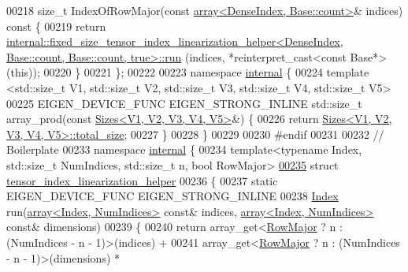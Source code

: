 \begin{DoxyCode}
00218   \textcolor{keywordtype}{size\_t} IndexOfRowMajor(\textcolor{keyword}{const} \hyperlink{class_eigen_1_1array}{array<DenseIndex, Base::count>}& indices)\textcolor{keyword}{ const
       }\{
00219     \textcolor{keywordflow}{return} 
      \hyperlink{struct_eigen_1_1internal_1_1fixed__size__tensor__index__linearization__helper}{internal::fixed\_size\_tensor\_index\_linearization\_helper<DenseIndex, Base::count, Base::count, true>::run}
      (indices, *reinterpret\_cast<const Base*>(\textcolor{keyword}{this}));
00220   \}
00221 \};
00222 
00223 \textcolor{keyword}{namespace }\hyperlink{namespaceinternal}{internal} \{
00224 \textcolor{keyword}{template} <std::\textcolor{keywordtype}{size\_t} V1, std::\textcolor{keywordtype}{size\_t} V2, std::\textcolor{keywordtype}{size\_t} V3, std::\textcolor{keywordtype}{size\_t} V4, std::\textcolor{keywordtype}{size\_t} V5>
00225 EIGEN\_DEVICE\_FUNC EIGEN\_STRONG\_INLINE std::size\_t array\_prod(\textcolor{keyword}{const} 
      \hyperlink{struct_eigen_1_1_sizes}{Sizes<V1, V2, V3, V4, V5>}&) \{
00226   \textcolor{keywordflow}{return} \hyperlink{struct_eigen_1_1_sizes}{Sizes<V1, V2, V3, V4, V5>::total\_size};
00227 \}
00228 \}
00229 
00230 \textcolor{preprocessor}{#endif}
00231 
00232 \textcolor{comment}{// Boilerplate}
00233 \textcolor{keyword}{namespace }\hyperlink{namespaceinternal}{internal} \{
00234 \textcolor{keyword}{template}<\textcolor{keyword}{typename} Index, std::\textcolor{keywordtype}{size\_t} NumIndices, std::\textcolor{keywordtype}{size\_t} n, \textcolor{keywordtype}{bool} RowMajor>
\hyperlink{struct_eigen_1_1internal_1_1tensor__index__linearization__helper}{00235} \textcolor{keyword}{struct }\hyperlink{struct_eigen_1_1internal_1_1tensor__index__linearization__helper}{tensor\_index\_linearization\_helper}
00236 \{
00237   \textcolor{keyword}{static} EIGEN\_DEVICE\_FUNC EIGEN\_STRONG\_INLINE
00238   \hyperlink{namespace_eigen_a62e77e0933482dafde8fe197d9a2cfde}{Index} run(\hyperlink{class_eigen_1_1array}{array<Index, NumIndices>} \textcolor{keyword}{const}& indices, 
      \hyperlink{class_eigen_1_1array}{array<Index, NumIndices>} \textcolor{keyword}{const}& dimensions)
00239   \{
00240     \textcolor{keywordflow}{return} array\_get<\hyperlink{group__enums_ggaacded1a18ae58b0f554751f6cdf9eb13acfcde9cd8677c5f7caf6bd603666aae3}{RowMajor} ? n : (NumIndices - n - 1)>(indices) +
00241       array\_get<\hyperlink{group__enums_ggaacded1a18ae58b0f554751f6cdf9eb13acfcde9cd8677c5f7caf6bd603666aae3}{RowMajor} ? n : (NumIndices - n - 1)>(dimensions) *

\end{DoxyCode}

